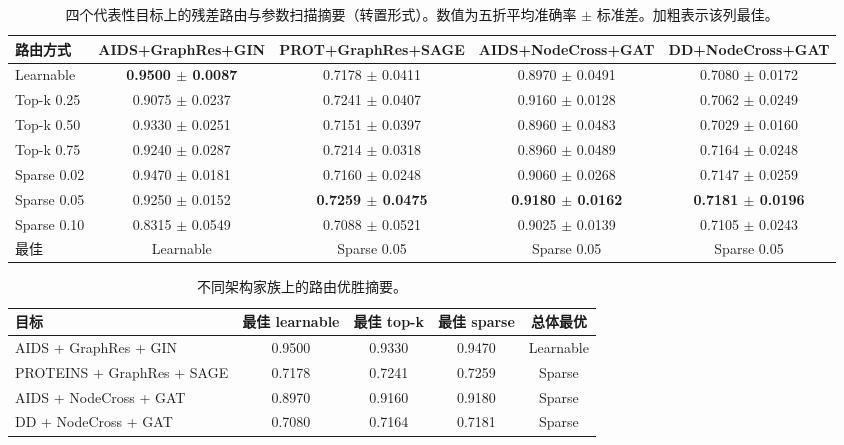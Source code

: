 \begin{table}[t]
\centering
\scriptsize
\setlength{\tabcolsep}{3.5pt}
\caption{四个代表性目标上的残差路由与参数扫描摘要（转置形式）。数值为五折平均准确率 $\pm$ 标准差。加粗表示该列最佳。}
\label{tab:residual_routing_full}
\begin{tabular}{lcccc}
\toprule
路由方式 & AIDS+GraphRes+GIN & PROT+GraphRes+SAGE & AIDS+NodeCross+GAT & DD+NodeCross+GAT \\
\midrule
Learnable & \textbf{0.9500 $\pm$ 0.0087} & 0.7178 $\pm$ 0.0411 & 0.8970 $\pm$ 0.0491 & 0.7080 $\pm$ 0.0172 \\
Top-k 0.25 & 0.9075 $\pm$ 0.0237 & 0.7241 $\pm$ 0.0407 & 0.9160 $\pm$ 0.0128 & 0.7062 $\pm$ 0.0249 \\
Top-k 0.50 & 0.9330 $\pm$ 0.0251 & 0.7151 $\pm$ 0.0397 & 0.8960 $\pm$ 0.0483 & 0.7029 $\pm$ 0.0160 \\
Top-k 0.75 & 0.9240 $\pm$ 0.0287 & 0.7214 $\pm$ 0.0318 & 0.8960 $\pm$ 0.0489 & 0.7164 $\pm$ 0.0248 \\
Sparse 0.02 & 0.9470 $\pm$ 0.0181 & 0.7160 $\pm$ 0.0248 & 0.9060 $\pm$ 0.0268 & 0.7147 $\pm$ 0.0259 \\
Sparse 0.05 & 0.9250 $\pm$ 0.0152 & \textbf{0.7259 $\pm$ 0.0475} & \textbf{0.9180 $\pm$ 0.0162} & \textbf{0.7181 $\pm$ 0.0196} \\
Sparse 0.10 & 0.8315 $\pm$ 0.0549 & 0.7088 $\pm$ 0.0521 & 0.9025 $\pm$ 0.0139 & 0.7105 $\pm$ 0.0243 \\
\midrule
最佳 & Learnable & Sparse 0.05 & Sparse 0.05 & Sparse 0.05 \\
\bottomrule
\end{tabular}
\end{table}

\begin{table}[t]
\centering
\footnotesize
\caption{不同架构家族上的路由优胜摘要。}
\label{tab:residual_routing_family}
\begin{tabular}{lcccc}
\toprule
目标 & 最佳 learnable & 最佳 top-k & 最佳 sparse & 总体最优 \\
\midrule
AIDS + GraphRes + GIN & 0.9500 & 0.9330 & 0.9470 & Learnable \\
PROTEINS + GraphRes + SAGE & 0.7178 & 0.7241 & 0.7259 & Sparse \\
AIDS + NodeCross + GAT & 0.8970 & 0.9160 & 0.9180 & Sparse \\
DD + NodeCross + GAT & 0.7080 & 0.7164 & 0.7181 & Sparse \\
\bottomrule
\end{tabular}
\end{table}
